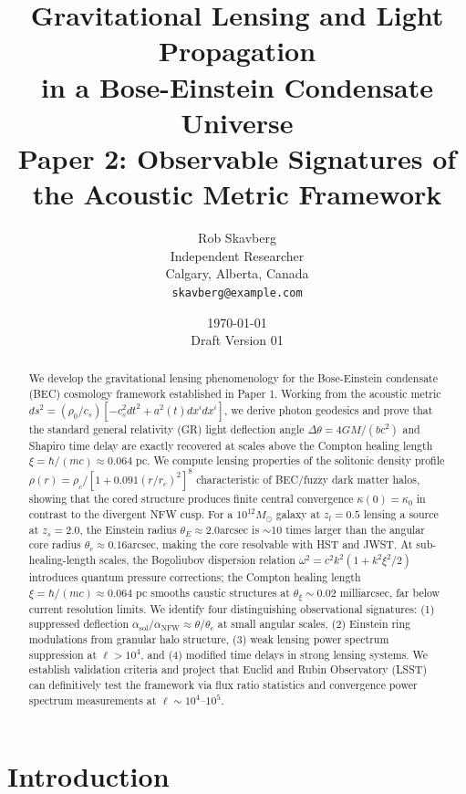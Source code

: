 \documentclass[11pt,a4paper]{article}
\title{\textbf{Gravitational Lensing and Light Propagation\\in a Bose-Einstein Condensate Universe}\\[0.5em]
\large Paper 2: Observable Signatures of the Acoustic Metric Framework}
\author{Rob Skavberg\\[0.3em]
\small Independent Researcher\\
\small Calgary, Alberta, Canada\\
\small \texttt{skavberg@example.com}}
\date{\today\\[0.5em]
\small Draft Version 01}
\newcommand{\Msun}{\ensuremath{M_\odot}}
\newcommand{\arcsec}{\ensuremath{\text{arcsec}}}
\theoremstyle{definition}
\theoremstyle{remark}
\begin{document}
\maketitle

\begin{abstract}
We develop the gravitational lensing phenomenology for the Bose-Einstein condensate (BEC) cosmology framework established in Paper 1. Working from the acoustic metric $ds^2 = (\rho_0/c_s)[-c_s^2 dt^2 + a^2(t) dx^i dx^i]$, we derive photon geodesics and prove that the standard general relativity (GR) light deflection angle $\Delta\theta = 4GM/(bc^2)$ and Shapiro time delay are exactly recovered at scales above the Compton healing length $\xi = \hbar/(mc) \approx 0.064$ pc. We compute lensing properties of the solitonic density profile $\rho(r) = \rho_c/[1 + 0.091(r/r_c)^2]^8$ characteristic of BEC/fuzzy dark matter halos, showing that the cored structure produces finite central convergence $\kappa(0) = \kappa_0$ in contrast to the divergent NFW cusp. For a $10^{12} \Msun$ galaxy at $z_l = 0.5$ lensing a source at $z_s = 2.0$, the Einstein radius $\theta_E \approx 2.0\arcsec$ is $\sim$10 times larger than the angular core radius $\theta_c \approx 0.16\arcsec$, making the core resolvable with HST and JWST. At sub-healing-length scales, the Bogoliubov dispersion relation $\omega^2 = c^2 k^2(1 + k^2\xi^2/2)$ introduces quantum pressure corrections; the Compton healing length $\xi = \hbar/(mc) \approx 0.064$ pc smooths caustic structures at $\theta_\xi \sim 0.02$ milliarcsec, far below current resolution limits. We identify four distinguishing observational signatures: (1) suppressed deflection $\alpha_{\mathrm{sol}}/\alpha_{\mathrm{NFW}} \approx \theta/\theta_c$ at small angular scales, (2) Einstein ring modulations from granular halo structure, (3) weak lensing power spectrum suppression at $\ell > 10^4$, and (4) modified time delays in strong lensing systems. We establish validation criteria and project that Euclid and Rubin Observatory (LSST) can definitively test the framework via flux ratio statistics and convergence power spectrum measurements at $\ell \sim 10^4$--$10^5$.
\end{abstract}

\tableofcontents
\newpage

\section{Introduction}
\label{sec:introduction}
\end{document}

